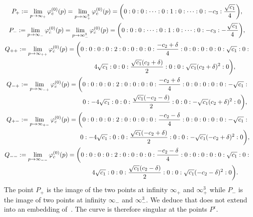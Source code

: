 \documentclass[10pt,a4paper]{amsart}
\numberwithin{equation}{section}
\begin{document}
\begin{gather*}
 P_+ := \lim \limits_{p\rightarrow \infty_{+}}\varphi_c^{(0)}(p)= \lim \limits_{p\rightarrow \infty^3_{+}}\varphi_c^{(0)}(p)= \biggl(0:0:0:\dots:0:1:0:\dots:0:-c_3:\frac{ \sqrt{c_1}}{4}\biggr),\\
 P_- := \lim \limits_{p\rightarrow \infty_{-}}\varphi_c^{(0)}(p)= \lim \limits_{p\rightarrow \infty^3_{-}}\varphi_c^{(0)}(p)= \biggl(0:0:0:\dots:0:1:0:\dots:0:-c_3:-\frac{
 \sqrt{c_1}}{4}\biggr),\\
 Q_{++} := \lim \limits_{p\rightarrow
 \infty_{++}}\varphi_c^{(0)}(p)
 = \biggl(0:0:0:0:2:0:0:0:0:\frac{-c_2+\delta}{4}:0:0:0:0:0: \sqrt{c_1}:0:\\ \hphantom{Q_{++}:=\lim \limits_{p\rightarrow\infty_{++}}\varphi_c^{(0)}(p)= \biggl(}{}
 4\sqrt{c_1}:0:0:\frac{\sqrt{c_1}(c_2+\delta)}{2}:0:0:\sqrt{c_1}(c_2+\delta)^2:0\biggr),\\
 Q_{-+} := \lim \limits_{p\rightarrow
 \infty_{-+}}\varphi_c^{(0)}(p)
 = \biggl(0:0:0:0:2:0:0:0:0:\frac{-c_2+\delta}{4}:0:0:0:0:0: -\sqrt{c_1}:\\ \hphantom{ Q_{-+}:= \lim \limits_{p\rightarrow\infty_{-+}}\varphi_c^{(0)}(p)= \biggl(}{}
 0:-4\sqrt{c_1}:0:0:\frac{\sqrt{c_1}(-c_2-\delta)}{2}:0:0:-\sqrt{c_1}(c_2+\delta)^2:0\biggr),\\
 Q_{+-} := \lim \limits_{p\rightarrow
 \infty_{+-}}\varphi_c^{(0)}(p)
 = \biggl(0:0:0:0:2:0:0:0:0:\frac{-c_2-\delta}{4}:0:0:0:0:0: -\sqrt{c_1}:\\ \hphantom{Q_{+-} := \lim \limits_{p\rightarrow\infty_{+-}}\varphi_c^{(0)}(p) = \biggl(}
 0:-4\sqrt{c_1}:0:0:\frac{\sqrt{c_1}(-c_2+\delta)}{2}:0:0:-\sqrt{c_1}(-c_2+\delta)^2:0\biggr),\\
Q_{--} := \lim \limits_{p\rightarrow
 \infty_{--}}\varphi_c^{(0)}(p)
 = \biggl(0:0:0:0:2:0:0:0:0:\frac{-c_2-\delta}{4}:0:0:0:0:0: \sqrt{c_1}:0:\\ \hphantom{Q_{--} := \lim \limits_{p\rightarrow\infty_{--}}\varphi_c^{(0)}(p)= \biggl(}{}
 4\sqrt{c_1}:0:0:\frac{\sqrt{c_1}(c_2-\delta)}{2}:0:0:\sqrt{c_1}(-c_2-\delta)^2:0\biggr).
\end{gather*}
The point $P_+$ is the image of the two points at infinity
$\infty_{+}$ and $\infty^3_{+}$ while $P_-$ is the image of two
points at infinity $\infty_{-}$ and $\infty^3_{-}$. We deduce that
 does not extend into an embedding of~. The curve
 is therefore singular at the points
$P^{\epsilon}$.
\end{document}

